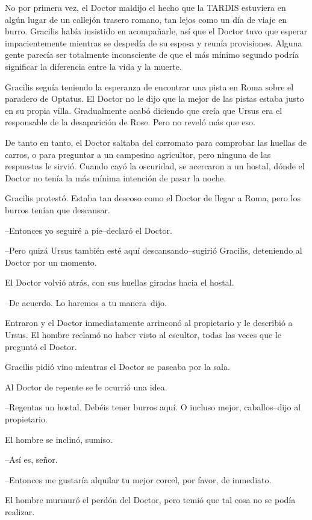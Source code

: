 No por primera vez, el Doctor maldijo el hecho que la TARDIS estuviera
en algún lugar de un callejón trasero romano, tan lejos como un día de
viaje en burro. Gracilis había insistido en acompañarle, así que el
Doctor tuvo que esperar impacientemente mientras se despedía de su
esposa y reunía provisiones. Alguna gente parecía ser totalmente
inconsciente de que el más mínimo segundo podría significar la
diferencia entre la vida y la muerte.

Gracilis seguía teniendo la esperanza de encontrar una pista en Roma
sobre el paradero de Optatus. El Doctor no le dijo que la mejor de las
pistas estaba justo en su propia villa. Gradualmente acabó diciendo que
creía que Ursus era el responsable de la desaparición de Rose. Pero no
reveló más que eso.

De tanto en tanto, el Doctor saltaba del carromato para comprobar las
huellas de carros, o para preguntar a un campesino agricultor, pero
ninguna de las respuestas le sirvió. Cuando cayó la oscuridad, se
acercaron a un hostal, dónde el Doctor no tenía la más mínima intención
de pasar la noche.

Gracilis protestó. Estaba tan deseoso como el Doctor de llegar a Roma,
pero los burros tenían que descansar.

--Entonces yo seguiré a pie--declaró el Doctor.

--Pero quizá Ursus también esté aquí descansando--sugirió Gracilis,
deteniendo al Doctor por un momento.

El Doctor volvió atrás, con sus huellas giradas hacia el hostal.

--De acuerdo. Lo haremos a tu manera--dijo.

Entraron y el Doctor inmediatamente arrinconó al propietario y le
describió a Ursus. El hombre reclamó no haber visto al escultor, todas
las veces que le preguntó el Doctor.

Gracilis pidió vino mientras el Doctor se paseaba por la sala.

Al Doctor de repente se le ocurrió una idea.

--Regentas un hostal. Debéis tener burros aquí. O incluso mejor,
caballos--dijo al propietario.

El hombre se inclinó, sumiso.

--Así es, señor.

--Entonces me gustaría alquilar tu mejor corcel, por favor, de
inmediato.

El hombre murmuró el perdón del Doctor, pero temió que tal cosa no se
podía realizar.

